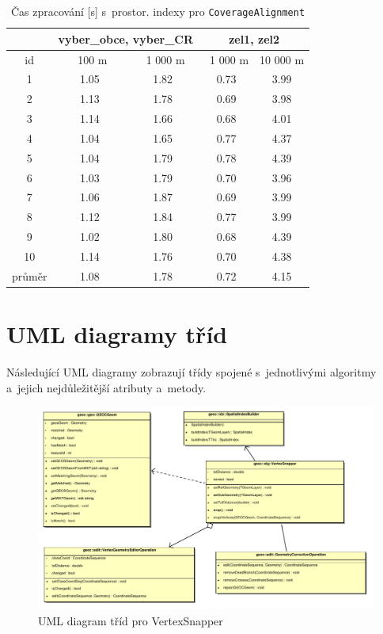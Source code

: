 \vspace{-200pt} %
\begin{table}
\centering
 \begin{tabular}{|c|c|c|c|c|}
  \hline
     & \multicolumn{2}{c|}{vyber\_obce, vyber\_CR} & 
	\multicolumn{2}{c|}{zel1, zel2} \\
  \hline
   id  &  ~~100 m~ & ~1 000 m & ~1 000 m & 10 000 m\\
  \hline
  \hline
1  &1.05 & 1.82 &  0.73 & 3.99 \\
2  &1.13 & 1.78 &  0.69 & 3.98 \\
3  &1.14 & 1.66 &  0.68 & 4.01 \\
4  &1.04 & 1.65 &  0.77 & 4.37 \\
5  &1.04 & 1.79 &  0.78 & 4.39 \\
6  &1.03 & 1.79 &  0.70 & 3.96 \\
7  &1.06 & 1.87 &  0.69 & 3.99 \\
8  &1.12 & 1.84 &  0.77 & 3.99 \\
9  &1.02 & 1.80 &  0.68 & 4.39 \\
10 &1.14 & 1.76 &  0.70 & 4.38 \\
  \hline
  \hline
  průměr & 1.08 &1.78 & 0.72 & 4.15 \\
  \hline
 \end{tabular}
  \caption{ Čas zpracování [s] s~prostor. indexy pro 
	    \texttt{Coverage\-Alignment}}
  \label{tab:ca-s}
\end{table} 


\newpage
\chapter{UML diagramy tříd}
\label{priloha-diagramy}

Následující UML diagramy zobrazují třídy spojené s~jednotlivými 
algoritmy a~jejich nejdůležitější atributy a~metody.

\label{uml-vs}
  \begin{figure}[hbt]
    \centering
      \includegraphics[width=430pt]{./pictures/uml-vs.pdf}
      \caption{UML diagram tříd pro VertexSnapper}
      \label{fig:uml-vs}
  \end{figure}

